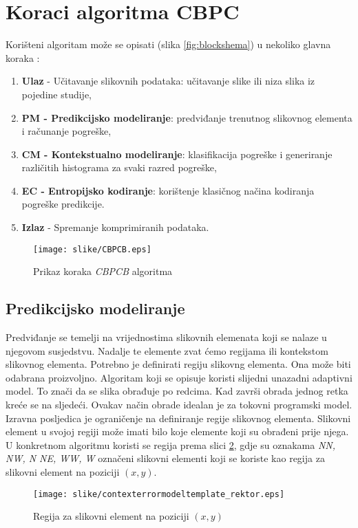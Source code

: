\documentclass[times, utf8, zavrsni, numeric, sort]{fer}
\begin{document}
\section{Koraci algoritma CBPC}
Korišteni algoritam može se opisati (slika \ref{fig:blockshema}) u nekoliko glavna koraka \cite{Knezovic:007}:
\begin{enumerate}
	\item \textbf{Ulaz} - Učitavanje slikovnih podataka: učitavanje slike ili niza slika iz pojedine studije,
	\item \textbf{PM - Predikcijsko modeliranje}: predviđanje trenutnog slikovnog elementa i računanje pogreške,
	\item \textbf{CM - Kontekstualno modeliranje}: klasifikacija pogreške i generiranje različitih histograma za svaki razred pogreške,
	\item \textbf{EC - Entropijsko kodiranje}: korištenje klasičnog načina kodiranja pogreške predikcije.
	\item \textbf{Izlaz} - Spremanje komprimiranih podataka.
\end{enumerate}

\begin{figure}[htb]
\centering
\texttt{[image: slike/CBPCB.eps]}
\caption{Prikaz koraka \emph{CBPCB} algoritma}
\label{fig:blockdiagram}
\end{figure}
	
	
\subsection{Predikcijsko modeliranje}
Predviđanje se temelji na vrijednostima slikovnih elemenata koji se nalaze u njegovom susjedstvu. Nadalje te elemente zvat ćemo regijama ili kontekstom slikovnog elementa. Potrebno je definirati regiju slikovng elementa. Ona može biti odabrana proizvoljno. Algoritam koji se opisuje koristi slijedni unazadni adaptivni model. To znači da se slika obrađuje po redcima. Kad završi obrada jednog retka kreće se na sljedeći. Ovakav način obrade idealan je za tokovni programski model. Izravna posljedica je ograničenje na definiranje regije slikovnog elementa. Slikovni element u svojoj regiji može imati bilo koje elemente koji su obrađeni prije njega. U konkretnom algoritmu koristi se regija prema slici \ref{fig:regija}, gdje su oznakama \emph{NN, NW, N NE, WW, W} označeni slikovni elementi koji se koriste kao regija za slikovni element na poziciji $(x,y)$.

\begin{figure}[htb]
\centering
\texttt{[image: slike/contexterrormodeltemplate\_rektor.eps]}
\caption{Regija za slikovni element na poziciji $(x,y)$}
\label{fig:regija}
\end{figure}
\end{document}
